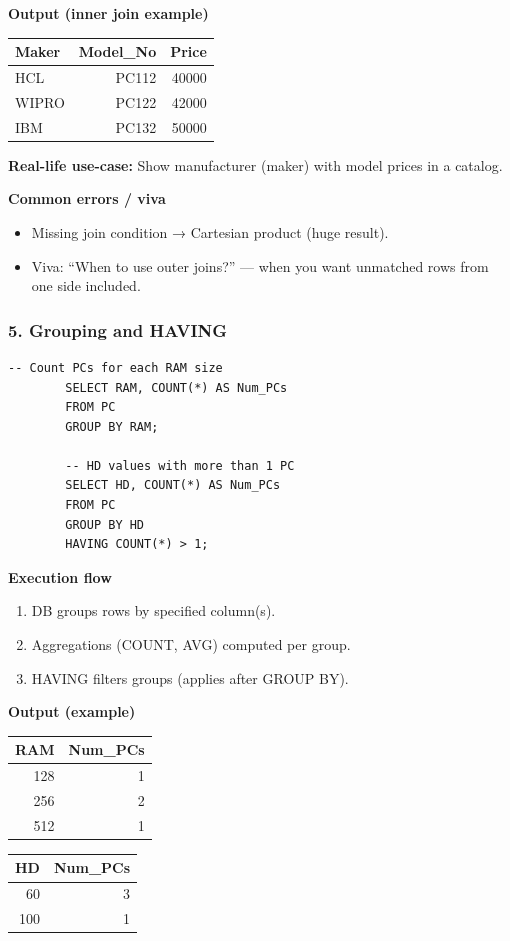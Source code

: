 \documentclass[11pt,a4paper]{article}
\begin{document}
	\textbf{Output (inner join example)}
	\begin{center}
		\begin{tabular}{lrr}
			\toprule
			Maker & Model\_No & Price \\
			\midrule
			HCL & PC112 & 40000 \\
			WIPRO & PC122 & 42000 \\
			IBM & PC132 & 50000 \\
			\bottomrule
		\end{tabular}
	\end{center}
	
	\textbf{Real-life use-case:} Show manufacturer (maker) with model prices in a catalog.
	
	\textbf{Common errors / viva}
	\begin{itemize}[noitemsep]
		\item Missing join condition → Cartesian product (huge result).  
		\item Viva: ``When to use outer joins?'' — when you want unmatched rows from one side included.
	\end{itemize}
	
	\bigskip
	\subsubsection*{5. Grouping and HAVING}
	\begin{lstlisting}[caption={Count PCs by RAM and HD groups}]
		-- Count PCs for each RAM size
		SELECT RAM, COUNT(*) AS Num_PCs
		FROM PC
		GROUP BY RAM;
		
		-- HD values with more than 1 PC
		SELECT HD, COUNT(*) AS Num_PCs
		FROM PC
		GROUP BY HD
		HAVING COUNT(*) > 1;
	\end{lstlisting}
	
	\textbf{Execution flow}
	\begin{enumerate}[noitemsep]
		\item DB groups rows by specified column(s).  
		\item Aggregations (COUNT, AVG) computed per group.  
		\item HAVING filters groups (applies after GROUP BY).
	\end{enumerate}
	
	\textbf{Output (example)}
	\begin{center}
		\begin{tabular}{rr}
			\toprule
			RAM & Num\_PCs \\
			\midrule
			128 & 1 \\
			256 & 2 \\
			512 & 1 \\
			\bottomrule
		\end{tabular}
		\quad
		\begin{tabular}{rr}
			\toprule
			HD & Num\_PCs \\
			\midrule
			60 & 3 \\
			100 & 1 \\
			\bottomrule
		\end{tabular}
	\end{center}
	
\end{document}
